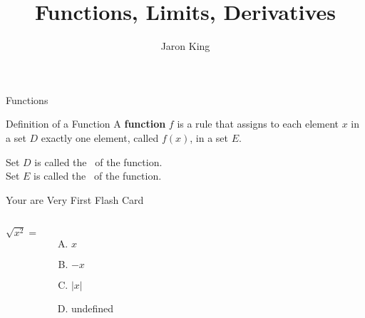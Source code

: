 \documentclass{beamer}
\title[Short Title]{Functions, Limits, Derivatives}
\author[Jaron]{Jaron King}
\institute{\textbf{Institute}: this is my first slide made by \LaTeX}
\date{}
\begin{document}

\begin{frame}
\titlepage
\end{frame}


\begin{frame}[t]{Functions}\vspace{4pt}

\begin{block}{Definition of a Function}
\vspace{0.5em}
A \textbf{function} $f$ is a rule that assigns to each element $x$ in a 
set $D$ exactly one element, called $f(x)$, in a set $E$. 
\vspace{0.5em}
\end{block}

\vspace{10pt}
Set $D$ is called the 
\, of the function.\\[10pt]
 
Set $E$ is called the 
\, of the function.

\end{frame}

\begin{frame}{Your are Very First Flash Card}\vspace{10pt}
\begin{columns}[onlytextwidth]

$\sqrt{x^2}=$\\[10pt]
\begin{enumerate}[(A)]
\item $x$
\item $-x$
\item $|x|$
\item undefined
\end{enumerate}

\end{columns}
\end{frame}
\end{document}
